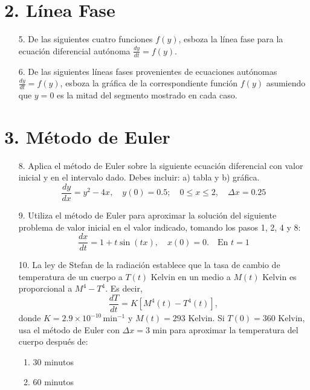 \documentclass{article}
\begin{document}
\section*{2. Línea Fase}

\begin{enumerate}
    \item[5.] De las siguientes cuatro funciones \( f(y) \), esboza la línea fase para la ecuación diferencial autónoma \( \frac{dy}{dt} = f(y) \).
    
    \item[6.] De las siguientes líneas fases provenientes de ecuaciones autónomas \( \frac{dy}{dt} = f(y) \), esboza la gráfica de la correspondiente función \( f(y) \) asumiendo que \( y = 0 \) es la mitad del segmento mostrado en cada caso.
\end{enumerate}

\section*{3. Método de Euler}

\begin{enumerate}
    \item[8.] Aplica el método de Euler sobre la siguiente ecuación diferencial con valor inicial y en el intervalo dado. Debes incluir: a) tabla y b) gráfica.
    \[
    \frac{dy}{dx} = y^2 - 4x, \quad y(0) = 0.5; \quad 0 \leq x \leq 2, \quad \Delta x = 0.25
    \]
    
    \item[9.] Utiliza el método de Euler para aproximar la solución del siguiente problema de valor inicial en el valor indicado, tomando los pasos 1, 2, 4 y 8:
    \[
    \frac{dx}{dt} = 1 + t \sin(tx), \quad x(0) = 0. \quad \text{En } t = 1
    \]
    
    \item[10.] La ley de Stefan de la radiación establece que la tasa de cambio de temperatura de un cuerpo a \( T(t) \) Kelvin en un medio a \( M(t) \) Kelvin es proporcional a \( M^4 - T^4 \). Es decir,
    \[
    \frac{dT}{dt} = K \left[ M^4(t) - T^4(t) \right],
    \]
    donde \( K = 2.9 \times 10^{-10} \, \text{min}^{-1} \) y \( M(t) = 293 \) Kelvin. Si \( T(0) = 360 \) Kelvin, usa el método de Euler con \( \Delta x = 3 \) min para aproximar la temperatura del cuerpo después de:
    \begin{enumerate}[label=\alph*)]
        \item 30 minutos
        \item 60 minutos
    \end{enumerate}
\end{enumerate}
\end{document}
